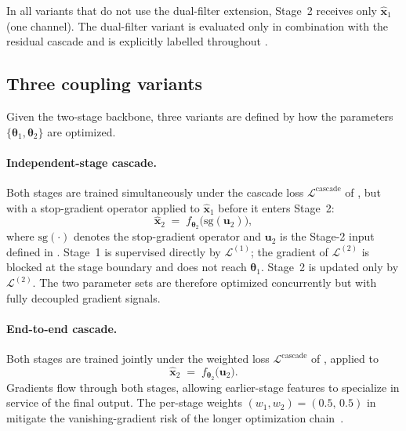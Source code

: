In all variants that do not use the dual-filter extension, Stage~2 receives only $\hat{\mathbf{x}}_1$ (one channel). The dual-filter variant is evaluated only in combination with the residual cascade and is explicitly labelled throughout .
\subsection{Three coupling variants}
\label{subsec:meth_cascade_variants}

Given the two-stage backbone, three variants are defined by how the parameters
$\{\boldsymbol{\theta}_1, \boldsymbol{\theta}_2\}$ are optimized.

\paragraph{Independent-stage cascade.}
Both stages are trained simultaneously under the cascade loss
$\mathcal{L}^{\mathrm{cascade}}$ of , but with a
stop-gradient operator applied to $\hat{\mathbf{x}}_{1}$ before it enters Stage~2:
\begin{equation}
    \hat{\mathbf{x}}_{2}
    \;=\; f_{\boldsymbol{\theta}_{2}}\!\bigl(\mathrm{sg}(\mathbf{u}_2)\bigr),
    \label{eq:meth_ind_input}
\end{equation}
where $\mathrm{sg}(\cdot)$ denotes the stop-gradient operator and $\mathbf{u}_2$ is the Stage-2
input defined in . Stage~1 is supervised directly
by $\mathcal{L}^{(1)}$; the gradient of $\mathcal{L}^{(2)}$ is blocked at the stage boundary
and does not reach $\boldsymbol{\theta}_1$. Stage~2 is updated only by $\mathcal{L}^{(2)}$.
The two parameter sets are therefore optimized concurrently but with fully decoupled gradient
signals.

\paragraph{End-to-end cascade.}
Both stages are trained jointly under the weighted loss
$\mathcal{L}^{\mathrm{cascade}}$ of ,
applied to
\begin{equation}
    \hat{\mathbf{x}}_{2}
    \;=\; f_{\boldsymbol{\theta}_{2}}\!\bigl(\mathbf{u}_2\bigr).
    \label{eq:meth_e2e_input}
\end{equation}
Gradients flow through both stages, allowing earlier-stage features to specialize in service of the
final output. The per-stage weights $(w_{1}, w_{2}) = (0.5,\,0.5)$ in
 mitigate the vanishing-gradient risk of the longer optimization
chain~\cite{He2016}.

